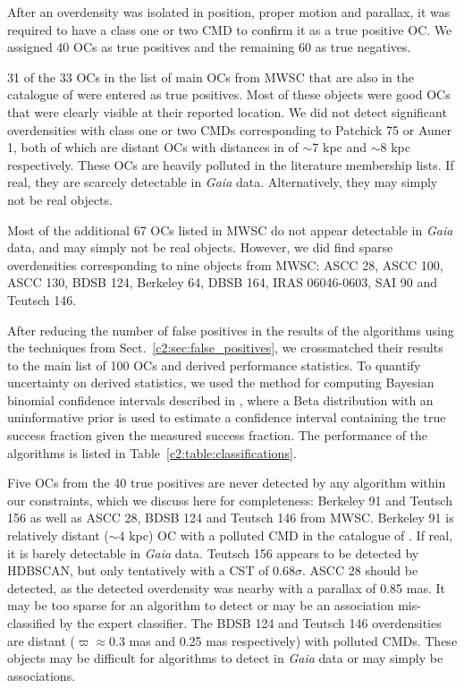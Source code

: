 After an overdensity was isolated in position, proper motion and parallax, it was required to have a class one or two CMD to confirm it as a true positive OC. We assigned 40 OCs as true positives and the remaining 60 as true negatives.

31 of the 33 OCs in the list of main OCs from MWSC that are also in the catalogue of \cite{cantat-gaudin_clusters_2020} were entered as true positives. Most of these objects were good OCs that were clearly visible at their reported location. We did not detect significant overdensities with class one or two CMDs corresponding to Patchick 75 or Auner 1, both of which are distant OCs with distances in \cite{cantat-gaudin_clusters_2020} of $\sim$7 kpc and $\sim$8 kpc respectively. These OCs are heavily polluted in the literature membership lists. If real, they are scarcely detectable in \emph{Gaia} data. Alternatively, they may simply not be real objects.

Most of the additional 67 OCs listed in MWSC do not appear detectable in \emph{Gaia} data, and may simply not be real objects. However, we did find sparse overdensities corresponding to nine objects from MWSC: ASCC 28, ASCC 100, ASCC 130, BDSB 124, Berkeley 64, DBSB 164, IRAS 06046-0603, SAI 90 and Teutsch 146. 

After reducing the number of false positives in the results of the algorithms using the techniques from Sect.~\ref{c2:sec:false_positives}, we crossmatched their results to the main list of 100 OCs and derived performance statistics. To quantify uncertainty on derived statistics, we used the method for computing Bayesian binomial confidence intervals described in \cite{cameron_estimation_2011}, where a Beta distribution with an uninformative prior is used to estimate a confidence interval containing the true success fraction given the measured success fraction. The performance of the algorithms is listed in Table~\ref{c2:table:classifications}. 

Five OCs from the 40 true positives are never detected by any algorithm within our constraints, which we discuss here for completeness: Berkeley 91 and Teutsch 156 \citep[objects from][]{cantat-gaudin_clusters_2020} as well as ASCC 28, BDSB 124 and Teutsch 146 from MWSC. Berkeley 91 is relatively distant ($\sim4$ kpc) OC with a polluted CMD in the catalogue of \cite{cantat-gaudin_clusters_2020}. If real, it is barely detectable in \emph{Gaia} data. Teutsch 156 appears to be detected by HDBSCAN, but only tentatively with a CST of 0.68$\sigma$. ASCC 28 should be detected, as the detected overdensity was nearby with a parallax of 0.85 mas. It may be too sparse for an algorithm to detect or may be an association mis-classified by the expert classifier. The BDSB 124 and Teutsch 146 overdensities are distant ($\varpi \approx 0.3$ mas and 0.25 mas respectively) with polluted CMDs. These objects may be difficult for algorithms to detect in \emph{Gaia} data or may simply be associations.


